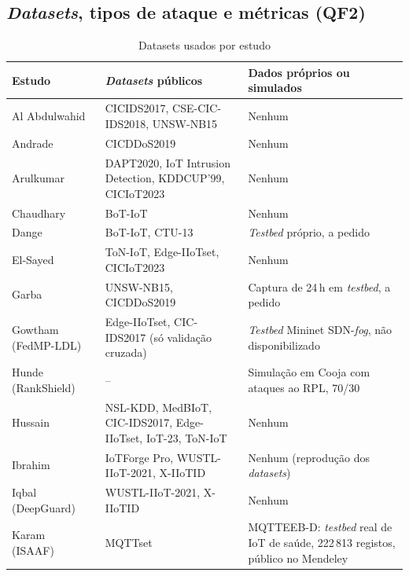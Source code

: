 \documentclass[conference,a4paper]{IEEEtran}
\begin{document}
\subsection{\textit{Datasets}, tipos de ataque e métricas (QF2)}\label{sec:qf2}
\begin{table}[p]
\caption{Datasets usados por estudo}\label{tab:datasets}
\centering\scriptsize
\renewcommand{\arraystretch}{0.84}
\setlength{\tabcolsep}{3pt}
\begin{tabular}{@{}>{\raggedright\arraybackslash}p{}>{\raggedright\arraybackslash}p{}>{\raggedright\arraybackslash}p{}@{}}
\toprule
Estudo & \textit{Datasets} públicos & Dados próprios ou simulados \\
\midrule
Al Abdulwahid~\cite{Abdulwahid2025} & CICIDS2017, CSE-CIC-IDS2018, UNSW-NB15 & Nenhum \\
Andrade~\cite{andrade2024ddos} & CICDDoS2019 & Nenhum \\
Arulkumar~\cite{Arulkumar2026} & DAPT2020, IoT Intrusion Detection, KDDCUP'99, CICIoT2023 & Nenhum \\
Chaudhary~\cite{Chaudhary2025} & BoT-IoT & Nenhum \\
Dange~\cite{dange2025dual} & BoT-IoT, CTU-13 & \textit{Testbed} próprio, a pedido \\
El-Sayed~\cite{elsayed2024mpguard} & ToN-IoT, Edge-IIoTset, CICIoT2023 & Nenhum \\
Garba~\cite{garba2024sdn} & UNSW-NB15, CICDDoS2019 & Captura de 24\,h em \textit{testbed}, a pedido \\
Gowtham (FedMP-LDL)~\cite{gowtham2026fedmp} & Edge-IIoTset, CIC-IDS2017 (só validação cruzada) & \textit{Testbed} Mininet SDN-\textit{fog}, não disponibilizado \\
Hunde (RankShield)~\cite{hunde2026rankshield} & -- & Simulação em Cooja com ataques ao RPL, 70/30 \\
Hussain~\cite{hussain2026postquantum} & NSL-KDD, MedBIoT, CIC-IDS2017, Edge-IIoTset, IoT-23, ToN-IoT & Nenhum \\
Ibrahim~\cite{ibrahim2026purechain} & IoTForge Pro, WUSTL-IIoT-2021, X-IIoTID & Nenhum (reprodução dos \textit{datasets}) \\
Iqbal (DeepGuard)~\cite{Iqbal2026} & WUSTL-IIoT-2021, X-IIoTID & Nenhum \\
Karam (ISAAF)~\cite{karam2025isaaf} & MQTTset & MQTTEEB-D: \textit{testbed} real de IoT de saúde, 222\,813 registos, público no Mendeley \\

\end{tabular}
\end{table}
\end{document}
